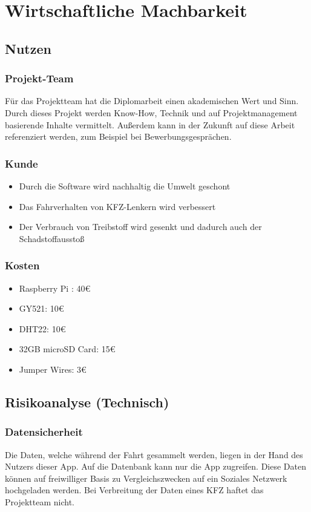 \chapter{Wirtschaftliche Machbarkeit}



\section{Nutzen}
 
 \subsection{Projekt-Team}
 Für das Projektteam hat die Diplomarbeit einen akademischen Wert und Sinn.
 Durch dieses Projekt werden Know-How, Technik und auf Projektmanagement
 basierende Inhalte vermittelt. Außerdem kann in der Zukunft auf diese Arbeit
 referenziert werden, zum Beispiel bei Bewerbungsgesprächen.
 \subsection{Kunde}
 \begin{itemize}
 \item Durch die Software wird nachhaltig die Umwelt geschont
 \item Das Fahrverhalten von KFZ-Lenkern wird verbessert
 \item Der Verbrauch von Treibstoff wird gesenkt und dadurch auch der Schadstoffausstoß
 \end{itemize}
 \subsection{Kosten}
 \begin{itemize}
 \item Raspberry Pi : 40€
 \item GY521: 10€
 \item DHT22: 10€
 \item 32GB microSD Card: 15€
 \item Jumper Wires: 3€
 \end{itemize}
\section{Risikoanalyse (Technisch)}
 
 \subsection{Datensicherheit}
 Die Daten, welche während der Fahrt gesammelt werden, liegen in der Hand des
 Nutzers dieser App. Auf die Datenbank kann nur die App zugreifen.
 Diese Daten können auf freiwilliger Basis zu Vergleichszwecken 
 auf ein Soziales Netzwerk hochgeladen werden.
 Bei Verbreitung der Daten eines KFZ haftet das Projektteam nicht.

